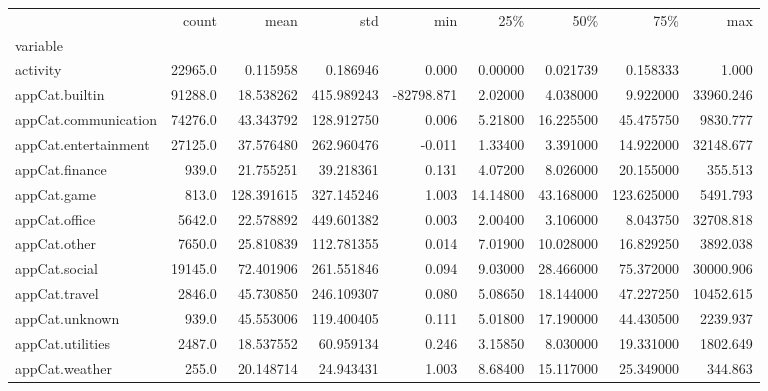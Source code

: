 \begin{tabular}{lrrrrrrrr}
\toprule
{} &     count &        mean &         std &        min &       25\% &        50\% &         75\% &        max \\
variable             &           &             &             &            &           &            &             &            \\
\midrule
activity             &   22965.0 &    0.115958 &    0.186946 &      0.000 &   0.00000 &   0.021739 &    0.158333 &      1.000 \\
appCat.builtin       &   91288.0 &   18.538262 &  415.989243 & -82798.871 &   2.02000 &   4.038000 &    9.922000 &  33960.246 \\
appCat.communication &   74276.0 &   43.343792 &  128.912750 &      0.006 &   5.21800 &  16.225500 &   45.475750 &   9830.777 \\
appCat.entertainment &   27125.0 &   37.576480 &  262.960476 &     -0.011 &   1.33400 &   3.391000 &   14.922000 &  32148.677 \\
appCat.finance       &     939.0 &   21.755251 &   39.218361 &      0.131 &   4.07200 &   8.026000 &   20.155000 &    355.513 \\
appCat.game          &     813.0 &  128.391615 &  327.145246 &      1.003 &  14.14800 &  43.168000 &  123.625000 &   5491.793 \\
appCat.office        &    5642.0 &   22.578892 &  449.601382 &      0.003 &   2.00400 &   3.106000 &    8.043750 &  32708.818 \\
appCat.other         &    7650.0 &   25.810839 &  112.781355 &      0.014 &   7.01900 &  10.028000 &   16.829250 &   3892.038 \\
appCat.social        &   19145.0 &   72.401906 &  261.551846 &      0.094 &   9.03000 &  28.466000 &   75.372000 &  30000.906 \\
appCat.travel        &    2846.0 &   45.730850 &  246.109307 &      0.080 &   5.08650 &  18.144000 &   47.227250 &  10452.615 \\
appCat.unknown       &     939.0 &   45.553006 &  119.400405 &      0.111 &   5.01800 &  17.190000 &   44.430500 &   2239.937 \\
appCat.utilities     &    2487.0 &   18.537552 &   60.959134 &      0.246 &   3.15850 &   8.030000 &   19.331000 &   1802.649 \\
appCat.weather       &     255.0 &   20.148714 &   24.943431 &      1.003 &   8.68400 &  15.117000 &   25.349000 &    344.863 \\

\end{tabular}
